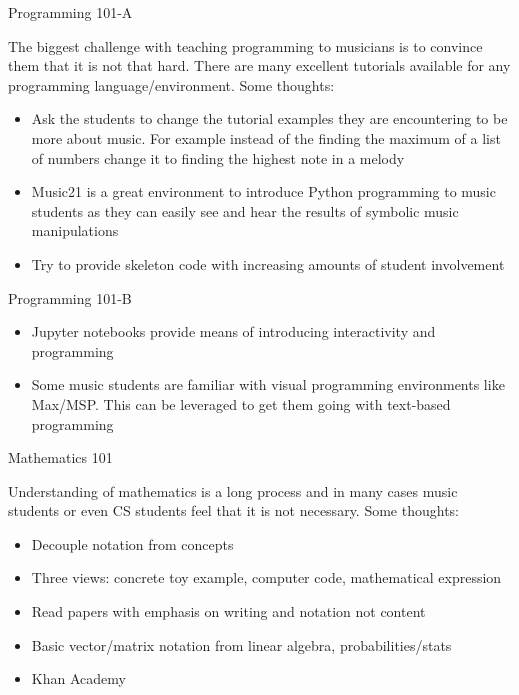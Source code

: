 \documentclass[12pt]{beamer}
\begin{document}
\begin{frame}{Programming 101-A}

  The biggest challenge with teaching programming to musicians
  is to convince them that it is not that hard. There are many
  excellent tutorials available for any programming language/environment.
  Some thoughts:

  \begin{itemize}
  \item{Ask the students to change the tutorial examples they are encountering to be more about music. For example instead of the finding the maximum of a list of numbers change it to finding the highest note in a melody}
  \item{Music21 is a great environment to introduce Python programming
    to music students as they can easily see and hear the results of symbolic music manipulations}
  \item{Try to provide skeleton code with increasing amounts of student involvement}
    \end{itemize} 
  \end{frame}
  
\begin{frame}{Programming 101-B}

  \begin{itemize} 
  \item{Jupyter notebooks provide means of introducing interactivity and programming}
  \item{Some music students are familiar with visual programming environments like Max/MSP. This can be leveraged to get them going with text-based programming} 
  \end{itemize} 
  
\end{frame}


\begin{frame}{Mathematics 101}

  Understanding of mathematics is a long process and in many cases
  music students or even CS students feel that it is not necessary.
  Some thoughts:

  \begin{itemize}
    \item{Decouple notation from concepts} 
    \item{Three views: concrete toy example, computer code, mathematical expression}
    \item{Read papers with emphasis on writing and notation not content}
    \item{Basic vector/matrix notation from linear algebra, probabilities/stats}
    \item{Khan Academy}
  \end{itemize} 
\end{frame} 
\end{document}
